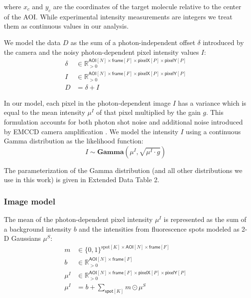 \noindent
where $x_c$ and $y_c$ are the coordinates of the target molecule relative to the center of the AOI. While experimental intensity measurements are integers we treat them as continuous values in our analysis.

We model the data $D$ as the sum of a photon-independent offset $\delta$ introduced by the camera and the noisy photon-dependent pixel intensity values $I$:
%
\begin{subequations}
\begin{align}
    \delta &\in \mathbb{R}_{>0}^{\mathsf{AOI}[N] \times \mathsf{frame}[F] \times \mathsf{pixelX}[P] \times \mathsf{pixelY}[P]} \\
    I &\in \mathbb{R}_{>0}^{\mathsf{AOI}[N] \times \mathsf{frame}[F] \times \mathsf{pixelX}[P] \times \mathsf{pixelY}[P]} \\ 
    D &= \delta + I
\end{align}
\end{subequations}

In our model, each pixel in the photon-dependent image $I$ has a  variance which is equal to  the mean intensity $\mu^I$ of that pixel multiplied by the gain $g$. This formulation accounts for both photon shot noise and additional noise introduced by EMCCD camera amplification \cite{Van_Vliet1998-jk}. We model the intensity $I$ using a continuous Gamma distribution as the likelihood function:
%
\begin{equation}
    I \sim \mathbf{Gamma} (\mu^I, \sqrt{\mu^I \cdot g})
\end{equation}

The parameterization of the Gamma distribution (and all other distributions we use in this work) is given in Extended Data Table 2.

\subsubsection*{Image model}

The mean of the photon-dependent pixel intensity $\mu^I$ is represented  as the sum of a background intensity $b$ and the intensities from fluorescence spots modeled as  2-D Gaussians $\mu^S$:
%
\begin{subequations}
\begin{align}
    m &\in \{ 0, 1 \}^{\mathrm{spot}[K] \times \mathsf{AOI}[N] \times \mathsf{frame}[F] } \\
    b &\in \mathbb{R}_{>0}^{\mathsf{AOI}[N] \times \mathsf{frame}[F]} \\
    \mu^I &\in \mathbb{R}_{>0}^{\mathsf{AOI}[N] \times \mathsf{frame}[F] \times \mathsf{pixelX}[P] \times \mathsf{pixelY}[P]} \\
    \mu^I &= b + \sum_{\mathsf{spot}[K]} m \odot{} \mu^S
\end{align}
\end{subequations}


